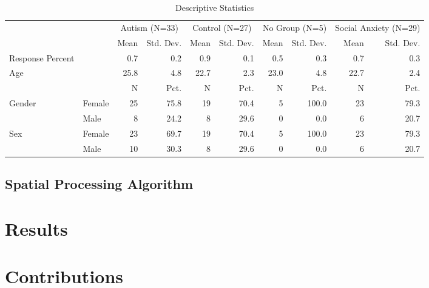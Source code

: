 \documentclass[
  letterpaper,
  authoryear]{elsarticle}
\begin{document}
\hypertarget{tbl-stats}{}
\begin{table}
\caption{\label{tbl-stats}Descriptive Statistics }\tabularnewline

\centering
\begin{tabular}[t]{llrrrrrrrr}
\toprule
\multicolumn{2}{c}{ } & \multicolumn{2}{c}{Autism (N=33)} & \multicolumn{2}{c}{Control (N=27)} & \multicolumn{2}{c}{No Group (N=5)} & \multicolumn{2}{c}{Social Anxiety (N=29)} \\
\cmidrule(l{3pt}r{3pt}){3-4} \cmidrule(l{3pt}r{3pt}){5-6} \cmidrule(l{3pt}r{3pt}){7-8} \cmidrule(l{3pt}r{3pt}){9-10}
  &    & Mean & Std. Dev. & Mean & Std. Dev. & Mean & Std. Dev. & Mean & Std. Dev.\\
\midrule
Response Percent &  & 0.7 & 0.2 & 0.9 & 0.1 & 0.5 & 0.3 & 0.7 & 0.3\\
Age &  & 25.8 & 4.8 & 22.7 & 2.3 & 23.0 & 4.8 & 22.7 & 2.4\\
\midrule
 &  & N & Pct. & N & Pct. & N & Pct. & N & Pct.\\
Gender & Female & 25 & 75.8 & 19 & 70.4 & 5 & 100.0 & 23 & 79.3\\
 & Male & 8 & 24.2 & 8 & 29.6 & 0 & 0.0 & 6 & 20.7\\
Sex & Female & 23 & 69.7 & 19 & 70.4 & 5 & 100.0 & 23 & 79.3\\
 & Male & 10 & 30.3 & 8 & 29.6 & 0 & 0.0 & 6 & 20.7\\
\bottomrule
\end{tabular}
\end{table}

\hypertarget{spatial-processing-algorithm}{%
\subsection{Spatial Processing
Algorithm}\label{spatial-processing-algorithm}}


\hypertarget{sec-results}{%
\section{Results}\label{sec-results}}


\hypertarget{sec-contribs}{%
\section{Contributions}\label{sec-contribs}}
\end{document}
